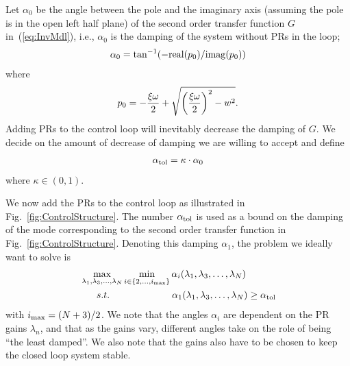 \documentclass[conference,10pt]{IEEEtran}
\begin{document}
Let $\alpha_0$ be the angle between the pole and the imaginary axis (assuming the pole is in the open left half plane) of the second order transfer function $G$ in~(\ref{eq:InvMdl}), i.e., $\alpha_0$ is the damping of the system without PRs in the loop;
\begin{align*}
\alpha_0 = \tan^{-1}(-{\rm real}(p_0) / {\rm imag}(p_0))
\end{align*}
where
\begin{align*}
p_0 = -\frac{\xi\omega}{2} + \sqrt{ \bigg{(} \frac{\xi\omega}{2}\bigg{)}^2- w^2}.
\end{align*}
Adding PRs to the control loop will inevitably 
decrease the damping of $G$. We decide on the amount of decrease of damping we are willing to accept and define
\begin{align*}
\alpha_{\rm tol} =  \kappa\cdot\alpha_0
\end{align*}
where $\kappa \in (0,1)$.

We now add the PRs to the control loop as illustrated in Fig.~\ref{fig:ControlStructure}. The number $\alpha_{\rm tol}$ is used as a bound on the damping of the mode corresponding to the second order transfer function in Fig.~\ref{fig:ControlStructure}.
Denoting this damping $\alpha_1$, the problem we ideally want to solve is
\begin{align}
\label{eq:MaxMinProb}
\begin{split}
&\max_{\lambda_1,\lambda_3,\dots, \lambda_N}\min_{i\in \{2, \dots, i_{\rm max}\}} \alpha_i(\lambda_1,\lambda_3,\dots, \lambda_N)\\
& \hspace{6mm} {s.t.} \hspace{23mm} \alpha_1(\lambda_1,\lambda_3,\dots, \lambda_N) \ge \alpha_{\rm tol}
\end{split}
\end{align}
with $i_{\rm max} = (N+3)/2$. We note that the angles $\alpha_i$ are dependent on the PR gains $\lambda_n$, and that as the gains vary, different angles take on the role of being ``the least damped''.
We also note that the gains also have to be chosen to keep the closed loop system stable.

\end{document}
